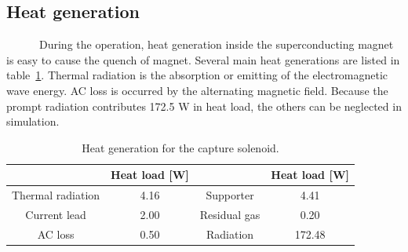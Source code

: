  \subsection{Heat generation}
~~~~~~During the operation, heat generation inside the superconducting magnet is easy to cause the quench of magnet.
Several main heat generations are listed in table~\ref{theat}. 
Thermal radiation is the absorption or emitting of the electromagnetic wave energy.
AC loss is occurred by the alternating magnetic field.
Because the prompt radiation contributes 172.5 W in heat load, the others can be neglected in simulation.
 \begin{table}[H]
  \centering
  \begin{tabular}{cccc} \hline \hline
    & Heat load [W] & & Heat load [W] \\ \hline
	Thermal radiation & 4.16 & Supporter & 4.41 \\
	Current lead & 2.00 & Residual gas & 0.20 \\
	AC loss & 0.50 & Radiation & 172.48 \\ \hline \hline
  \end{tabular}
  \caption{Heat generation for the capture solenoid.}
  \label{theat}
 \end{table}
